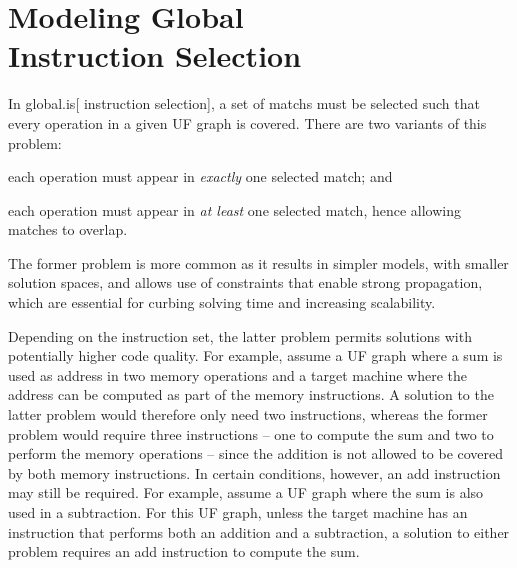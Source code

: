 %

\chapter[Modeling Global Instruction Selection]
        {Modeling Global\\ Instruction Selection}

In \gls{global.is}[ \gls{instruction selection}], a set of \glspl{match} must be
selected such that every \gls{operation} in a given \gls{UF graph} is covered.
%
There are two variants of this problem:
%
\begin{enumerate*}[label=(\arabic*)]
  \item each \gls{operation} must appear in \emph{exactly} one selected
    \gls{match}; and
%
  \item each \gls{operation} must appear in \emph{at least} one selected
    \gls{match}, hence allowing matches to \gls{overlap}.
\end{enumerate*}
%
The former problem is more common as it results in simpler models, with smaller
\glspl{solution space}, and allows use of \glspl{constraint} that enable strong
\gls{propagation}, which are essential for curbing solving time and increasing
scalability.

Depending on the \gls{instruction set}, the latter problem permits
\glspl{solution} with potentially higher code quality.
%
For example, assume a \gls{UF graph} where a sum is used as address in two
memory operations and a \gls{target machine} where the address can be computed
as part of the memory instructions.
%
A \gls{solution} to the latter problem would therefore only need two
instructions, whereas the former problem would require three instructions -- one
to compute the sum and two to perform the memory operations -- since the
addition is not allowed to be covered by both memory instructions.
%
In certain conditions, however, an add instruction may still be required.
%
For example, assume a \gls{UF graph} where the sum is also used in a
subtraction.
%
For this \gls{UF graph}, unless the \gls{target machine} has an instruction that
performs both an addition and a subtraction, a \gls{solution} to either problem
requires an add instruction to compute the sum.


